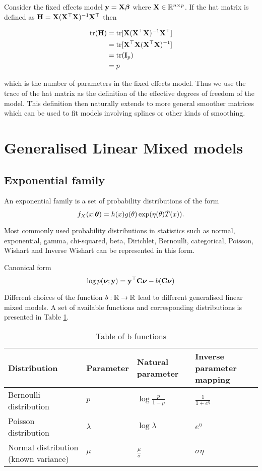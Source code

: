 \documentclass{amsart}[12pt]
\begin{document}

Consider the fixed effects model ${\bf y} = {\bf X} {\boldsymbol \beta}$ where ${\bf X} \in {\mathbb{R}}^{n \times p}$. If the hat matrix is
defined as ${\bf H} = {\bf X} ({\bf X}^\top{\bf X})^{-1} {\bf X}^\top$ then

\begin{align*}
\text{tr}({\bf H}) &= \text{tr}[{\bf X}({\bf X}^\top{\bf X})^{-1}{\bf X}^\top] \\
&= \text{tr}[{\bf X}^\top{\bf X} ({\bf X}^\top{\bf X})^{-1}] \\
&= \text{tr}({\bf I}_p) \\
&= p
\end{align*}

which is the number of parameters in the fixed effects model. Thus we use the trace of the hat matrix as
the definition of the effective degrees of freedom of the model. This definition then naturally extends to
more general smoother matrices which can be used to fit models involving splines or other kinds of smoothing.

\section{Generalised Linear Mixed models}

\subsection{Exponential family}

An exponential family is a set of probability distributions of the form
$$
f_X(x|{\boldsymbol \theta}) = h(x) g(\theta) \exp(\eta(\theta) \dot T(x)).
$$

Most commonly used probability distributions in statistics such as normal, exponential, gamma,
chi-squared, beta, Dirichlet, Bernoulli, categorical, Poisson, Wishart and Inverse Wishart can
be represented in this form.

Canonical form
$$
\log p({\boldsymbol \nu}; {\bf y}) = {\bf y}^\top {\bf C} {\boldsymbol\nu} - b({\bf C} {\boldsymbol \nu})
$$

Different choices of the function $b:{\mathbb{R}} \to {\mathbb{R}}$ lead to different generalised linear mixed models. A set
of available functions and corresponding distributions is presented in Table \ref{tab:b_functions}.

\begin{table}
\caption{Table of b functions}
\label{tab:b_functions}
\begin{tabular}{|l|lll|}
\hline
Distribution & Parameter & Natural parameter & Inverse parameter mapping \\
\hline
Bernoulli distribution & $p$ & $\log{\frac{p}{1 - p}}$ & $\frac{1}{1 + e^\eta}$ \\
Poisson distribution & $\lambda$ & $\log \lambda$ & $e^\eta$ \\
Normal distribution (known variance) & $\mu$ & $\frac{\mu}{\sigma}$ & $\sigma \eta$ \\
\hline
\end{tabular}
\end{table}
\end{document}
